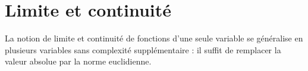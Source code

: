\documentclass[class=report,crop=false]{standalone}
\begin{document}
%
%

\section{Limite et continuité}

\vskip4mm

\noindent La notion de limite et continuité de fonctions d'une seule variable se généralise en plusieurs variables sans complexité supplémentaire : il suffit de remplacer la valeur absolue par la norme euclidienne.

\vskip6mm
\end{document}
